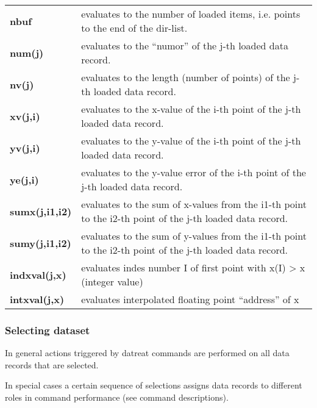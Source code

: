\documentclass[]{article}
\begin{document}
\begin{longtable}[]{@{}ll@{}}
\toprule
\endhead
\textbf{nbuf} & evaluates to the number of loaded items, i.e. points to
the end of the dir-list.\tabularnewline
\textbf{num(j)} & evaluates to the ``numor'' of the j-th loaded data
record.\tabularnewline
\textbf{nv(j)} & evaluates to the length (number of points) of the j-th
loaded data record.\tabularnewline
\textbf{xv(j,i)} & evaluates to the x-value of the i-th point of the
j-th loaded data record.\tabularnewline
\textbf{yv(j,i)} & evaluates to the y-value of the i-th point of the
j-th loaded data record.\tabularnewline
\textbf{ye(j,i)} & evaluates to the y-value error of the i-th point of
the j-th loaded data record.\tabularnewline
\textbf{sumx(j,i1,i2)} & evaluates to the sum of x-values from the i1-th
point to the i2-th point of the j-th loaded data record.\tabularnewline
\textbf{sumy(j,i1,i2)} & evaluates to the sum of y-values from the i1-th
point to the i2-th point of the j-th loaded data record.\tabularnewline
\textbf{indxval(j,x)} & evaluates indes number I of first point with
x(I) \textgreater{} x (integer value)\tabularnewline
\textbf{intxval(j,x)} & evaluates interpolated floating point
``address'' of x\tabularnewline
\bottomrule
\end{longtable}

\hypertarget{selecting-dataset}{%
\subsubsection{Selecting dataset }\label{selecting-dataset}}

In general actions triggered by datreat commands are performed on all
data records that are selected.

In special cases a certain sequence of selections assigns data records
to different roles in command performance (see command descriptions).
\end{document}
